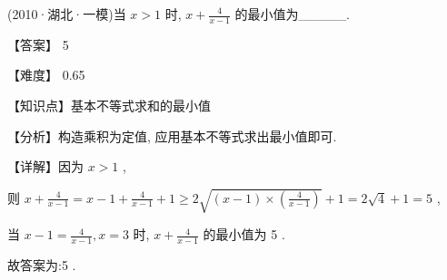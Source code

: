 \documentclass[11pt,a4paper]{article}
\begin{document}
\begin{hmwk} 
 (2010·湖北·一模)当 \(\displaystyle x > 1\) 时, \(\displaystyle x + \frac{4}{x - 1}\) 的最小值为\_\_\_\_\_.

\begin{jiexi}
【答案】 5

【难度】 0.65

【知识点】基本不等式求和的最小值

【分析】构造乘积为定值, 应用基本不等式求出最小值即可.

【详解】因为 \(\displaystyle x > 1\) ,

则 \(\displaystyle x + \frac{4}{x - 1} = x - 1 + \frac{4}{x - 1} + 1 \geq  2\sqrt{\left( {x - 1}\right)  \times  \left( \frac{4}{x - 1}\right) } + 1 = 2\sqrt{4} + 1 = 5\) ,

当 \(\displaystyle x - 1 = \frac{4}{x - 1},x = 3\) 时, \(\displaystyle x + \frac{4}{x - 1}\) 的最小值为 5 .

故答案为:5 .

\end{jiexi}
\end{hmwk}
\end{document}
